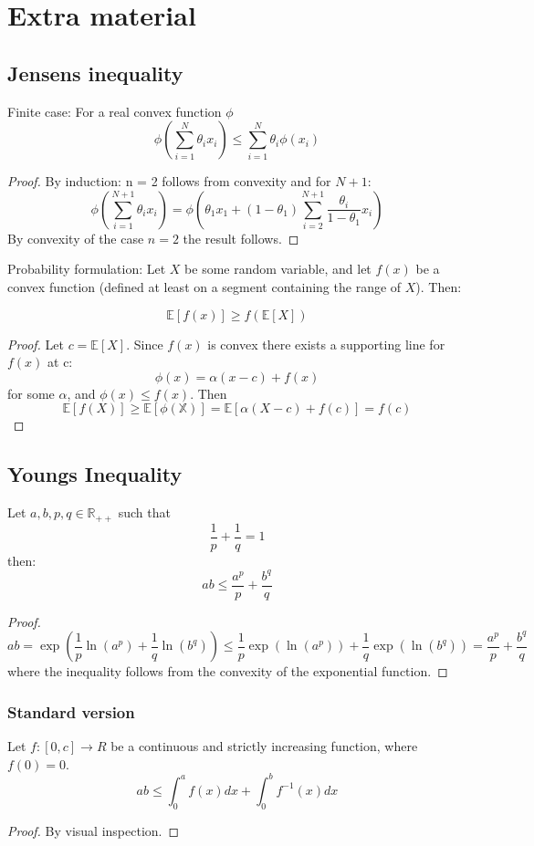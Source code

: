 \documentclass[titlepage]{article}
\begin{document}
\section{Extra material}
\subsection{Jensens inequality}
Finite case: For a real convex function $\phi$
$$\phi\left(\sum_{i= 1}^N \theta_ix_i\right) \leq \sum_{i=1}^N\theta_i \phi(x_i)$$
\begin{proof}
By induction: n = 2 follows from convexity and for $N+1$:
$$\phi\left(\sum_{i= 1}^{N+1} \theta_ix_i\right) =  \phi\left(\theta_1x_1 + (1-\theta_1)\sum_{i= 2}^{N+1} \frac{\theta_i}{1-\theta_1}x_i\right) $$
By convexity of the case $n= 2$ the result follows.
\end{proof}
Probability formulation:
Let $X$ be some random variable, and let $f(x)$ be a convex function (defined at least on a segment containing the range of $X$). Then:

$$\mathbb{E}[f(x)] \geq f(\mathbb{E}[X])$$
\begin{proof}
Let $c = \mathbb{E}[X]$. Since $f(x)$ is convex there exists a supporting line for $f(x)$ at c:
$$\phi(x) = \alpha(x-c) + f(x)$$
for some $\alpha$, and $\phi(x) \leq f(x)$. Then
$$ \mathbb{E}[f(X)] \geq \mathbb{E[\phi(X)]} = \mathbb{E}[\alpha(X-c) + f(c)] = f(c)$$
\end{proof}
\subsection{Youngs Inequality}
Let $a,b ,p, q \in \mathbb{R}_{++}$ such that
$$\frac{1}{p} + \frac{1}{q} = 1$$
then:
$$ab\leq \frac{a^p}{p}+ \frac{b^q}{q} $$
\begin{proof}
$$ab = \exp\left(\frac{1}{p} \ln(a^p) + \frac{1}{q}\ln(b^q)\right) \leq 
\frac{1}{p}\exp(\ln(a^p)) + \frac{1}{q}\exp(\ln(b^q)) = \frac{a^p}{p} + \frac{b^q}{q} $$
where the inequality follows from the convexity of the exponential function.
\end{proof}

\subsubsection{Standard version}
Let $f:[0,c]\longrightarrow R$ be a continuous and strictly increasing function, where $f(0) = 0$.
$$ab\leq\int_0^a f(x)dx + \int_0^b f^{-1}(x)dx $$

\begin{proof}
By visual inspection.
\end{proof}
\end{document}
